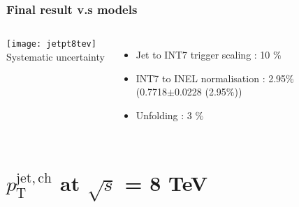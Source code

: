 \begin{frame}
\frametitle{Final result v.s models}
\begin{columns}[c]
\centering
\texttt{[image: jetpt8tev]}\\
Systematic uncertainty
\begin{itemize}
  \item{Jet to INT7 trigger scaling : 10 $\%$}
  \item{INT7 to INEL normalisation : 2.95$\%$ \\(0.7718$\pm$0.0228 (2.95$\%$))}
  \item{Unfolding : 3 $\%$ }
\end{itemize}

\end{columns}
\end{frame}



\section{$p_\mathrm{T}^\mathrm{jet,ch}$ at $\sqrt{s}$ = 8 TeV}

